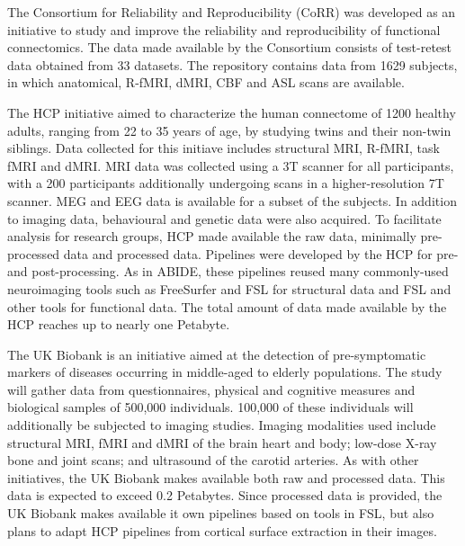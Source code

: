             The Consortium for Reliability and Reproducibility (CoRR) was
            developed as an initiative to study and improve the reliability and
            reproducibility of functional connectomics. The data made available
            by the Consortium consists of test-retest data obtained from 33
            datasets. The repository contains data from 1629 subjects, in which
            anatomical, R-fMRI, dMRI, CBF and ASL scans are available.


            The HCP initiative aimed to characterize the human connectome of
            1200 healthy adults, ranging from 22 to 35 years of age, by studying
            twins and their non-twin siblings. Data collected for this initiave
            includes structural MRI, R-fMRI, task fMRI and dMRI. MRI data was
            collected using a 3T scanner for all participants, with a 200
            participants additionally undergoing scans in a higher-resolution 7T
            scanner. MEG and EEG data is available for a subset of the subjects.
            In addition to imaging data, behavioural and genetic data were also
            acquired. To facilitate analysis for research groups, HCP made
            available the raw data, minimally pre-processed data and processed
            data. Pipelines were developed by the HCP for pre- and post-processing.
            As in ABIDE, these pipelines reused many commonly-used
            neuroimaging tools such as FreeSurfer and FSL for structural data
            and FSL and other tools for functional data. The total amount of
            data made available by the HCP reaches up to nearly one Petabyte.


            The UK Biobank is an initiative aimed at the detection of pre-symptomatic
            markers of diseases occurring in middle-aged to elderly
            populations. The study will gather data from questionnaires,
            physical and cognitive measures and biological samples of 500,000
            individuals. 100,000 of these individuals will additionally be
            subjected to imaging studies. Imaging modalities used include
            structural MRI, fMRI and dMRI of the brain heart and body; low-dose
            X-ray bone and joint scans; and ultrasound of the carotid arteries.
            As with other initiatives, the UK Biobank makes available both raw
            and processed data. This data is expected to exceed 0.2 Petabytes.
            Since processed data is provided, the UK Biobank makes available it
            own pipelines based on tools in FSL, but also plans to adapt HCP
            pipelines from cortical surface extraction in their images.

